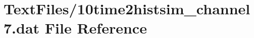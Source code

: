\hypertarget{10time2histsim__channel7_8dat}{}\section{Text\+Files/10time2histsim\+\_\+channel7.dat File Reference}
\label{10time2histsim__channel7_8dat}
